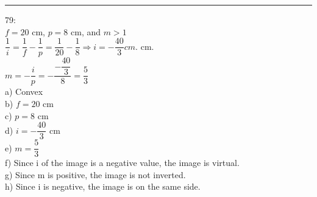 \documentclass[fleqn]{article}
\begin{document}
\begin{enumerate}
    \textcolor{hwColor}{
      \rule{15cm}{0.4pt}
    }

    \textcolor{hwColor}{
      79: \\
      $f=20$ cm, $p=8$ cm, and $m>1$ \\
      $\dfrac{1}{i}=\dfrac{1}{f}-\dfrac{1}{p}=\dfrac{1}{20}-\dfrac{1}{8} \Longrightarrow i=-\dfrac{40}{3} cm.$ cm. \\
      $m=-\dfrac{i}{p}=-\dfrac{-\dfrac{40}{3}}{8}=\dfrac{5}{3}$ \\
      a) Convex \\
      b) $f=20$ cm \\
      c) $p=8$ cm \\
      d) $i=-\dfrac{40}{3}$ cm \\
      e) $m=\dfrac{5}{3}$ \\
      f) Since i of the image is a negative value, the image is virtual. \\
      g) Since m is positive, the image is not inverted. \\
      h) Since i is negative, the image is on the same side. \\
    }
    
  \end{enumerate}
\end{document}
